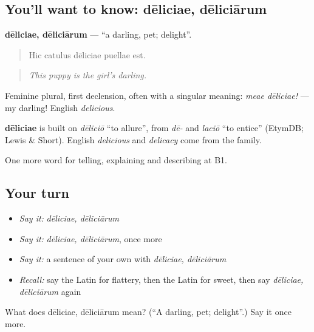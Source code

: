 \subsection*{You'll want to know: dēliciae, dēliciārum}
\textbf{dēliciae, dēliciārum} — \textquotedblleft{}a darling, pet; delight\textquotedblright{}.

\begin{quote}
Hic catulus dēliciae puellae est.
\end{quote}

\begin{quote}
\emph{This puppy is the girl's darling.}
\end{quote}

Feminine plural, first declension, often with a singular meaning: \emph{meae dēliciae!} — my darling! English \emph{delicious}.

\begin{cousinweb}
\textbf{dēliciae} is built on \emph{dēliciō} \textquotedblleft{}to allure\textquotedblright{}, from \emph{dē-} and \emph{laciō} \textquotedblleft{}to entice\textquotedblright{} (EtymDB; Lewis \& Short). English \emph{delicious} and \emph{delicacy} come from the family.
\end{cousinweb}

\begin{grammarlens}[title={What you've built}]
One more word for telling, explaining and describing at B1.
\end{grammarlens}

\subsection*{Your turn}
\begin{itemize}
\raggedright
  \item \emph{Say it:} \emph{dēliciae, dēliciārum}
  \item \emph{Say it:} \emph{dēliciae, dēliciārum}, once more
  \item \emph{Say it:} a sentence of your own with \emph{dēliciae, dēliciārum}
  \item \emph{Recall:} say the Latin for flattery, then the Latin for sweet, then say \emph{dēliciae, dēliciārum} again
\end{itemize}

\begin{tcolorbox}[breakable,colback=teal!4,colframe=teal!35!black,title={Before you move on}]
What does dēliciae, dēliciārum mean? (\textquotedblleft{}A darling, pet; delight\textquotedblright{}.) Say it once more.
\end{tcolorbox}

